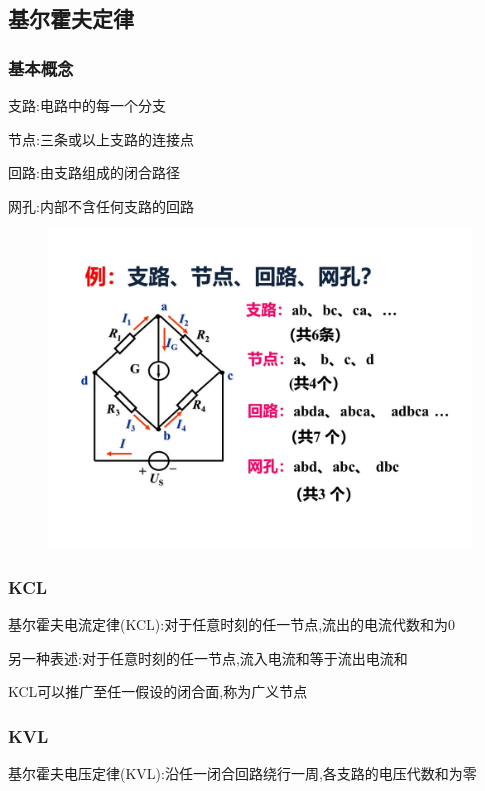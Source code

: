 \documentclass[12pt,a4paper,oneside]{ctexart}
\begin{document}
\subsection{基尔霍夫定律}
\subsubsection{基本概念}
支路:电路中的每一个分支

节点:三条或以上支路的连接点

回路:由支路组成的闭合路径

网孔:内部不含任何支路的回路
\begin{figure}[H]
    \centering
    \includegraphics{photos/支路节点回路网孔.jpg}
\end{figure}

\subsubsection{KCL}
基尔霍夫电流定律(KCL):对于任意时刻的任一节点,流出的电流代数和为0

另一种表述:对于任意时刻的任一节点,流入电流和等于流出电流和

KCL可以推广至任一假设的闭合面,称为广义节点

\subsubsection{KVL}
基尔霍夫电压定律(KVL):沿任一闭合回路绕行一周,各支路的电压代数和为零
\end{document}
